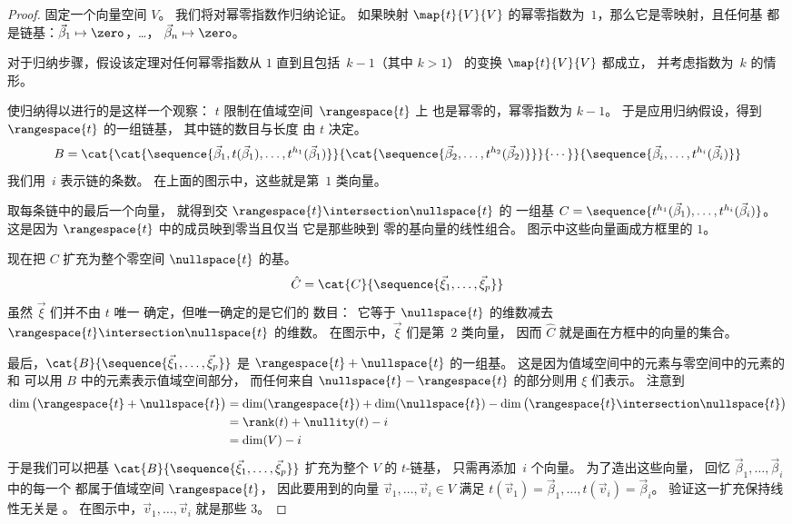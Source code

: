 \begin{proof}
固定一个向量空间 $V$。
我们将对幂零指数作归纳论证。
如果映射 $\map{t}{V}{V}$
的幂零指数为~\( 1 \)，那么它是零映射，且任何基
都是链基：$\vec{\beta}_1\mapsto\zero$，\ldots，
$\vec{\beta}_n\mapsto\zero$。

对于归纳步骤，假设该定理对任何幂零指数从 $1$ 直到且包括~\( k-1 \)（其中 $k>1$）
的变换 $\map{t}{V}{V}$
都成立，
并考虑指数为~$k$ 的情形。

使归纳得以进行的是这样一个观察：
\( t \) 限制在值域空间~\( \rangespace{t} \) 上
也是幂零的，幂零指数为 \( k-1 \)。
于是应用归纳假设，得到
\( \rangespace{t} \) 的一组链基，
其中链的数目与长度
由 \( t \) 决定。
\begin{equation*}
  B=\cat{\cat{\sequence{\vec{\beta}_1,t(\vec{\beta}_1),\dots,
     t^{h_1}(\vec{\beta}_1)}}{
  \cat{\sequence{\vec{\beta}_2,\ldots,t^{h_2}(\vec{\beta}_2)}}}{\cdots}}{
  \sequence{\vec{\beta}_i,\ldots,t^{h_i}(\vec{\beta}_i)} }
\end{equation*}
我们用~$i$ 表示链的条数。
在上面的图示中，这些就是第~\( 1 \) 类向量。

取每条链中的最后一个向量，
就得到交 \( \rangespace{t}\intersection\nullspace{t} \) 的
一组基
\( C=\sequence{t^{h_1}(\vec{\beta}_1),\dots,t^{h_i}(\vec{\beta}_i)} \)。
这是因为 \( \rangespace{t} \) 中的成员映到零当且仅当
它是那些映到
零的基向量的线性组合。
图示中这些向量画成方框里的 \( 1 \)。

现在把 \( C \) 扩充为整个零空间 \( \nullspace{t} \) 的基。
\begin{equation*}
  \hat{C}=\cat{C}{\sequence{\vec{\xi}_1,\dots,\vec{\xi}_p}}
\end{equation*}
虽然 \( \vec{\xi} \) 们并不由 $t$ 唯一
确定，但唯一确定的是它们的
数目：~它等于
\( \nullspace{t} \) 的维数减去
\( \rangespace{t}\intersection\nullspace{t} \) 的维数。
在图示中，$\vec{\xi}$ 们是第~\( 2 \) 类向量，
因而 \( \hat{C} \) 就是画在方框中的向量的集合。

最后，\( \cat{B}{\sequence{\vec{\xi}_1,\dots,\vec{\xi}_p}} \)
是 \( \rangespace{t}+\nullspace{t} \) 的一组基。
这是因为值域空间中的元素与零空间中的元素的
和
可以用 \( B \) 中的元素表示值域空间部分，
而任何来自
\( \nullspace{t}-\rangespace{t} \) 的部分则用 $\xi$ 们表示。
注意到
\begin{align*}
  \dim\big(\rangespace{t}+\nullspace{t}\big)
  &=
  \dim (\rangespace{t})+\dim (\nullspace{t})
    -\dim\big(\rangespace{t}\intersection\nullspace{t}\big)  \\
  &=
  \rank (t)+\nullity (t)-i          \\
  &=
  \dim (V)-i
\end{align*}
于是我们可以把基
\( \cat{B}{\sequence{\vec{\xi}_1,\dots,\vec{\xi}_p}} \)
扩充为整个 \( V \) 的 $t$-链基，
只需再添加~\( i \) 个向量。
为了造出这些向量，
回忆 \( \vec{\beta}_1,\dots,\vec{\beta}_i \) 中的每一个
都属于值域空间 \( \rangespace{t} \)，
因此要用到的向量
\( \vec{v}_1,\dots,\vec{v}_i\in V \) 满足
\( t(\vec{v}_1)=\vec{\beta}_1,\dots,t(\vec{v}_i)=\vec{\beta}_i \)。
验证这一扩充保持线性无关是
。
在图示中，\( \vec{v}_1,\dots,\vec{v}_i \) 就是那些 \( 3 \)。
\end{proof}

